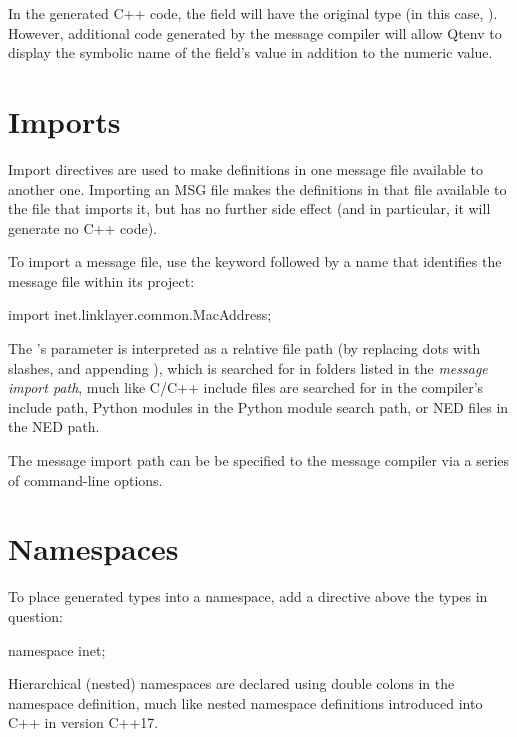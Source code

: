 In the generated C++ code, the field will have the original type (in this case,
). However, additional code generated by the message compiler
will allow Qtenv to display the symbolic name of the field's value in addition
to the numeric value.


\section{Imports}
\label{sec:msg-defs:imports}

Import directives are used to make definitions in one message file available to another
one. Importing an MSG file makes the definitions in that file available to the
file that imports it, but has no further side effect (and in particular, it will
generate no C++ code).

To import a message file, use the  keyword followed by a name
that identifies the message file within its project:

\begin{msg}
import inet.linklayer.common.MacAddress;
\end{msg}

The 's parameter is interpreted as a relative file path (by
replacing dots with slashes, and appending ), which is searched for in
folders listed in the \textit{message import path}, much like C/C++ include
files are searched for in the compiler's include path, Python modules in the
Python module search path, or NED files in the NED path.

The message import path can be be specified to the message compiler via a series
of  command-line options.


\section{Namespaces}
\label{sec:msg-defs:namespaces}
\label{sec:msg-defs:declaring-a-namespace} %

To place generated types into a namespace, add a  directive
above the types in question:

\begin{msg}
namespace inet;
\end{msg}

Hierarchical (nested) namespaces are declared using double colons in the
namespace definition, much like nested namespace definitions introduced into
C++ in version C++17.

